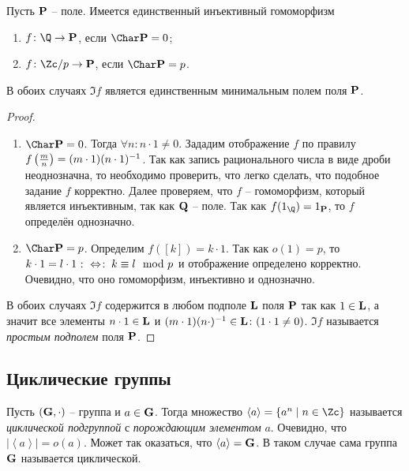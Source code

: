 \begin{theorem}
  Пусть $\mathbf{P}$ -- поле. Имеется единственный инъективный гомоморфизм
    \begin{enumerate}
      \item $f\colon\Q\to\Pb$, если $\Char\Pb=0$;
      \item $f\colon \Zc/p\to\Pb$, если $\Char\Pb=p$.
    \end{enumerate}  
  В обоих случаях $\Im f$ является единственным минимальным полем поля $\mathbf{P}$.
\end{theorem}
\begin{proof}\par\strut\\
  \begin{enumerate}
    \item $\Char\Pb=0$. Тогда $\forall n\colon n\cdot1\ne0$. Зададим
      отображение $f$ по правилу
      $f\left(\frac{m}n\right)\bw=(m\cdot1)(n\cdot 1)^{-1}$. Так как
      запись рационального числа в виде дроби неоднозначна, то
      необходимо проверить, что легко сделать, что подобное задание
      $f$ корректно. Далее проверяем, что $f$ -- гомоморфизм, который
      является инъективным, так как $\mathbf{Q}$ -- поле. Так как
      $f(1_\Q)=1_{\Pb}$, то $f$ определён однозначно.
    \item $\Char\Pb=p$. Определим $f([k])=k\cdot1$. Так как $o(1)=p$, то $k\cdot1=l\cdot1\mathbin{\colon\Leftrightarrow\colon} k\equiv l\mod p$ и отображение определено корректно. Очевидно, что оно гомоморфизм, инъективно и однозначно.
  \end{enumerate}
  
  В обоих случаях $\Im f$ содержится в любом подполе $\mathbf{L}$ поля $\mathbf{P}$ так как $1\in\mathbf{L}$, а значит все элементы $n\cdot1\in\mathbf{L}$ и $(m\cdot1)(n\cdot)^{-1}\in\mathbf{L}\colon(1\cdot1\ne0)$. $\Im f$ называется \emph{простым подполем} поля $\mathbf{P}$.
\end{proof}
\subsection{Циклические группы}

\begin{df}
Пусть $(\mathbf{G},\cdot)$ -- группа и $a\in\mathbf{G}$. Тогда множество $\left\langle a\right\rangle=\{a^n\mid n\in\Zc\}$ называется \emph{циклической подгруппой} с \emph{порождающим элементом} $a$. Очевидно, что $|\left\langle a\right\rangle|=o(a)$. Может так оказаться, что $\left\langle a\right\rangle = \mathbf{G}$. В таком случае сама группа $\mathbf{G}$ называется циклической.
\end{df}

